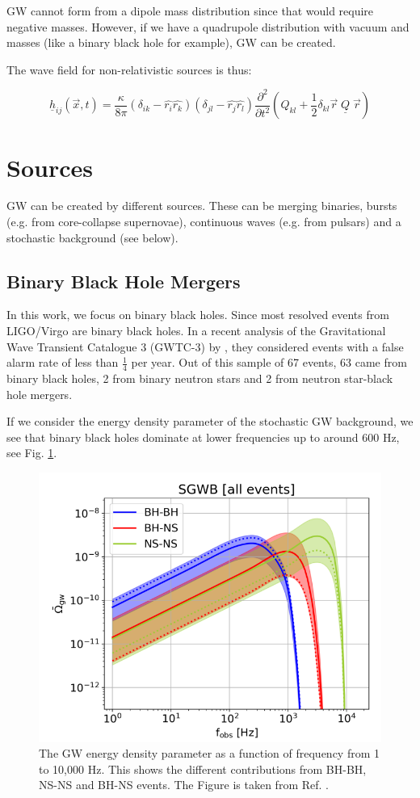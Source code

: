 GW cannot form from a dipole mass distribution since that would require negative masses. However, if we have a quadrupole distribution with vacuum and masses (like a binary black hole for example), GW can be created.

The wave field for non-relativistic sources is thus:

\begin{equation}
    \underline{h}_{ij}(\vec{x}, t)=\frac{\kappa}{8\pi}(\delta_{ik}-\hat{r_i}\hat{r_k})(\delta_{jl}-\hat{r_j}\hat{r_l})\frac{\partial^2}{\partial t^2}\left(Q_{kl}+\frac{1}{2}\delta_{kl}\vec{r}\; \underline{Q} \; \vec{r}\right)
\end{equation}

\section{Sources}
GW can be created by different sources. These can be
merging binaries, bursts (e.g. from core-collapse supernovae), continuous waves 
(e.g. from pulsars) and a stochastic background (see below).

\subsection{Binary Black Hole Mergers}
In this work, we focus on binary black holes. Since most resolved events from LIGO/Virgo are binary black holes. In a recent analysis of the Gravitational Wave Transient Catalogue 3 (GWTC-3) by \cite{the_ligo_scientific_collaboration_population_2022}, they considered events with a false alarm rate of less than $\frac{1}{4}$ per year. Out of this sample of 67 events, 63 came from binary black holes, 2 from binary neutron stars and 2 from neutron star-black hole mergers.

If we consider the energy density parameter of the stochastic GW background, we see that binary black holes dominate at lower frequencies up to around 600 Hz, see Fig. \ref{BG_sources}.

\begin{figure}[h]
    \centering
    \includegraphics[width=0.7\linewidth]{Images/Capurri_GW_Background_monopole_sources.png}
    \caption{The GW energy density parameter as a function of frequency from 1 to 10,000 Hz. This shows the different contributions from BH-BH, NS-NS and BH-NS events. The Figure is taken from Ref. \cite{capurri_intensity_2021}.}
    \label{BG_sources}
\end{figure} 

